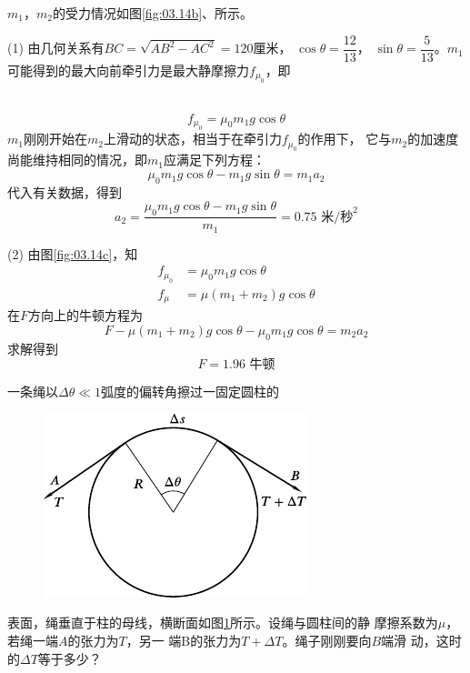 \solution $m_1$，$m_2$的受力情况如图\ref{fig:03.14b}、所示。

(1) 由几何关系有$ B C = \sqrt { A B ^ { 2 } - A C ^ { 2 } } = 1 2 0 $厘米，
$ \cos \theta = \dfrac { 1 2 } { 1 3 } $，
$ \sin \theta = \dfrac { 5 } { 1 3 } $。$ m _ { 1 } $
可能得到的最大向前牵引力是最大静摩擦力$ f _ { \mu _ 0 } $，即

~\vspace{-1.5em}
\begin{equation*}
  f _ {\mu _ 0 } = \mu _ { 0 } m _ { 1 } g \cos \theta
\end{equation*}
$m_1$刚刚开始在$m_2$上滑动的状态，相当于在牵引力$ f _{\mu _ 0} $的作用下，
它与$m_2$的加速度尚能维持相同的情况，即$m_1$应满足下列方程：
\begin{equation*}
  \mu _ { 0 } m _ { 1 } g \cos \theta - m _ { 1 } g \sin \theta = m _ { 1 } a _ { 2 }
\end{equation*}
代入有关数据，得到
\begin{equation*}
  a _ { 2 } = \frac { \mu_{ 0 } m_1 g \cos \theta - m _ { 1 } g \sin \theta } { m _ { 1 } } = 0 . 7 5 \text{ 米/秒}^2
\end{equation*}

(2) 由图\ref{fig:03.14c}，知
\begin{align*}
  f _ { \mu _ 0 } & = \mu _ { 0 } m _ { 1 } g \cos \theta                    \\
  f _ { \mu }     & = \mu \left( m _ { 1 } + m _ { 2 } \right) g \cos \theta
\end{align*}
在$ F $方向上的牛顿方程为
\begin{equation*}
  F - \mu \left( m _ { 1 } + m _ { 2 } \right) g \cos \theta - \mu _ { 0 } m _ { 1 } g \cos \theta = m _ { 2 } a _ { 2 }
\end{equation*}
求解得到
\begin{equation*}
  F = 1 . 9 6 \text{ 牛顿}
\end{equation*}

\example 一条绳以$ \Delta \theta \ll 1 $弧度的偏转角擦过一固定圆柱的
\begin{figure}
  \centering
  \includegraphics{figure/fig03.15}
  \caption{}
  \label{fig:03.15}
\end{figure}
表面，绳垂直于柱的母线，横断面如图\ref{fig:03.15}\;所示。设绳与圆柱间的静
摩擦系数为$\mu$，若绳一端$ A $的张力为$ T $，另一
端B的张力为$ T + \Delta T $。绳子刚刚要向$ B $端滑
动，这时的$ \Delta T $等于多少？

